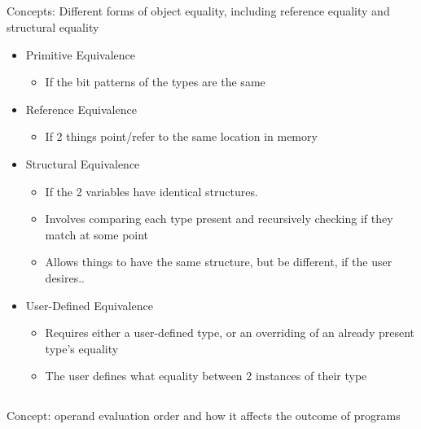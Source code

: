 \subsection{}
Concepts: Different forms of object equality, including reference equality and structural equality

\begin{itemize}
\item Primitive Equivalence
  \begin{itemize}[noitemsep]
  \item If the bit patterns of the types are the same
  \end{itemize}

\item Reference Equivalence
  \begin{itemize}[noitemsep]
  \item If 2 things point/refer to the same location in memory
  \end{itemize}

\item Structural Equivalence
  \begin{itemize}[noitemsep]
  \item If the 2 variables have identical structures.
  \item Involves comparing each type present and recursively checking if they match at some point
  \item Allows things to have the same structure, but be different, if the user desires..
  \end{itemize}

\item User-Defined Equivalence
  \begin{itemize}[noitemsep]
  \item Requires either a user-defined type, or an overriding of an already present type's equality
  \item The user defines what equality between 2 instances of their type
  \end{itemize}
\end{itemize}

\subsection{}
Concept: operand evaluation order and how it affects the outcome of programs

